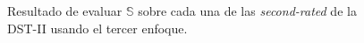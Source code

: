 \begin{figure}
	\centering
	\caption{Resultado de evaluar $\mathbb{S}$ sobre cada una de las \textit{second-rated} de la DST-II usando el tercer enfoque.} \label{fig:gaussian-example-approach3}
\end{figure}

